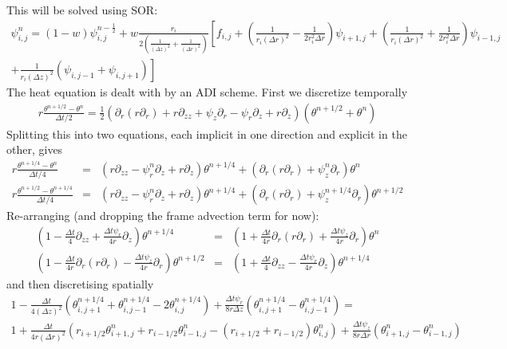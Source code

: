 \documentclass{article}
\begin{document}
This will be solved using SOR:
\begin{multline}
  \psi^n_{i,j} = (1-w) \psi_{i,j}^{n-\frac{1}{2}} + w \frac{r_i}{2 \left( \frac{1}{(\Delta z)^2} + \frac{1}{(\Delta r)^2}\right)} \left[ f_{i,j} + \left(\frac{1}{r_i (\Delta r)^2} - \frac{1}{2 r_i^2 \Delta r} \right) \psi_{i+1, j} +                            \left(\frac{1}{r_i (\Delta r)^2} + \frac{1}{2 r_i^2 \Delta r} \right) \psi_{i-1, j} \right.   \\
  +   \left. \frac{1}{r_i (\Delta z)^2} \left(\psi_{i,j-1} + \psi_{i, j+1} \right)                         \right] 
\end{multline}
The heat equation is dealt with by an ADI scheme. First we discretize temporally
\begin{eqnarray}
r \frac{\theta^{n+1/2} - \theta^n}{\Delta t / 2} = \frac{1}{2} \left(              \partial_r (r \partial_r) + r \partial_{zz} + \psi_z \partial_r - \psi_r \partial_z + r \partial_z            \right) \left( \theta^{n+1/2} + \theta^n \right)
\end{eqnarray} 
Splitting this into two equations, each implicit in one direction and explicit in the other, gives
\begin{eqnarray}
r \frac{\theta^{n+1/4} - \theta^n}{\Delta t / 4} &=& \left(  r \partial_{zz} -  \psi_r^n \partial_z + r \partial_z   \right) \theta^{n+1/4} + \left(  \partial_r (r \partial_r) +   \psi_z^n \partial_r    \right) \theta^{n}  \\
r \frac{\theta^{n+1/2} - \theta^{n+1/4}}{\Delta t / 4} &=&\left(  r \partial_{zz} -  \psi_r^n \partial_z + r \partial_z   \right) \theta^{n+1/4}   +   \left(  \partial_r (r \partial_r) +   \psi_z^{n+1/4} \partial_r    \right) \theta^{n+1/2}        
\end{eqnarray}
Re-arranging (and dropping the frame advection term for now):
\begin{eqnarray}
\left( 1 - \frac{\Delta t}{4} \partial_{zz} + \frac{\Delta t \psi_r}{4 r} \partial_z \right) \theta^{n+1/4} &=& \left(1 + \frac{\Delta t}{4 r} \partial_r (r \partial_r) + \frac{\Delta t \psi_z}{4 r} \partial_r \right) \theta^n \\
\left(1 - \frac{\Delta t}{4 r} \partial_r (r \partial_r) - \frac{\Delta t \psi_z}{4 r} \partial_r \right) \theta^{n+1/2} &=& \left( 1 + \frac{\Delta t}{4} \partial_{zz} - \frac{\Delta t \psi_r}{4 r} \partial_z \right) \theta^{n+1/4} 
\end{eqnarray}
and then discretising spatially
\newpage
\begin{multline}
 1 - \frac{\Delta t}{4 (\Delta z)^2} \left(\theta^{n+1/4}_{i, j+1} + \theta^{n+1/4}_{i, j-1} - 2 \theta^{n+1/4}_{i,j}\right) + \frac{\Delta t \psi_r}{8 r \Delta z} \left(\theta^{n+1/4}_{i,j+1} - \theta^{n+1/4}_{i, j-1} \right) = \\ 1 + \frac{\Delta t}{4 r (\Delta r)^2} \left(r_{i+1/2} \theta^n_{i+1, j} + r_{i-1/2} \theta^n_{i-1,j} - (r_{i+1/2} + r_{i-1/2}) \theta^n_{i,j} \right) + \frac{\Delta t \psi_z}{8 r \Delta r} \left( \theta^n_{i+1,j} - \theta^n_{i-1,j} \right)
\end{multline}
\end{document}
